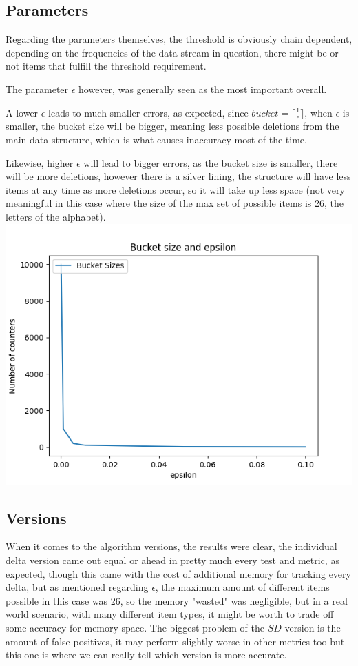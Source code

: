 \documentclass[...]{revdetua}
\begin{document}
\subsection{Parameters}
Regarding the parameters themselves, the threshold is obviously chain dependent, depending on the frequencies of the data stream in question, there might be or not items that fulfill the threshold requirement.\par
The parameter $\epsilon$ however, was generally seen as the most important overall.\par
A lower $\epsilon$ leads to much smaller errors, as expected, since $bucket=\lceil \frac{1}{\epsilon} \rceil$, when $\epsilon$ is smaller, the bucket size will be bigger, meaning less possible deletions from the main data structure, which is what causes inaccuracy most of the time.\par
Likewise, higher $\epsilon$ will lead to bigger errors, as the bucket size is smaller, there will be more deletions, however there is a silver lining, the structure will have less items at any time as more deletions occur, so it will take up less space (not very meaningful in this case where the size of the max set of possible items is 26, the letters of the alphabet).
\includegraphics[scale=0.5]{bucket size.png}



\subsection{Versions}
When it comes to the algorithm versions, the results were clear, the individual delta version came out equal or ahead in pretty much every test and metric, as expected, though this came with the cost of additional memory for tracking every delta, but as mentioned regarding $\epsilon$, the maximum amount of different items possible in this case was 26, so the memory "wasted" was negligible, but in a real world scenario, with many different item types, it might be worth to trade off some accuracy for memory space.
The biggest problem of the $SD$ version is the amount of false positives, it may perform slightly worse in other metrics too but this one is where we can really tell which version is more accurate.
\end{document}
